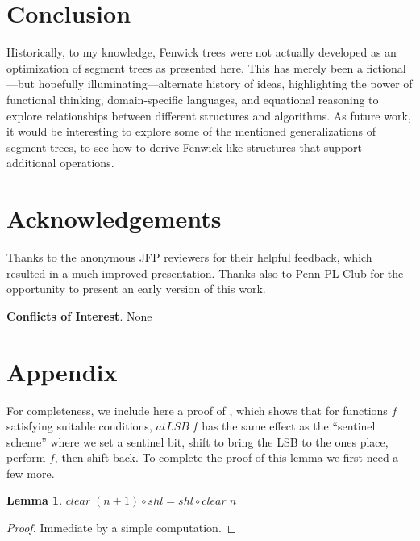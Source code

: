 \documentclass{jfp}
\newcommand{\Varid}[1]{\mathit{#1}}
\providecommand{\pref}{}
\renewcommand{\pref}[1]{\prettyref{#1}}
\newtheorem{lem}[thm]{Lemma}
\theoremstyle{definition}
\theoremstyle{remark}
\newif\ifJFP
\begin{document}
\section{Conclusion}

Historically, to my knowledge, Fenwick trees were not actually
developed as an optimization of segment trees as presented here.  This
has merely been a fictional---but hopefully illuminating---alternate
history of ideas, highlighting the power of functional thinking,
domain-specific languages, and equational reasoning to explore
relationships between different structures and algorithms.  As future
work, it would be interesting to explore some of the mentioned
generalizations of segment trees, to see how to derive Fenwick-like
structures that support additional operations.

\section*{Acknowledgements}

Thanks to the anonymous JFP reviewers for their helpful feedback,
which resulted in a much improved presentation.  Thanks also to Penn PL
Club for the opportunity to present an early version of this work.
\bigskip

\noindent \textbf{Conflicts of Interest}. None




\ifJFP
\else
\section*{Appendix}

For completeness, we include here a proof of
\pref{lem:sentinel-scheme}, which shows that for functions $f$
satisfying suitable conditions, \ensuremath{\Varid{atLSB}\;\Varid{f}} has the same effect as the
``sentinel scheme'' where we set a sentinel bit, shift to bring the
LSB to the ones place, perform $f$, then shift back.  To complete the
proof of this lemma we first need a few more.

\begin{lem} \label{lem:clearshl}
  \ensuremath{\Varid{clear}\;(\Varid{n}\mathbin{+}\mathrm{1})\mathbin{\circ}\Varid{shl}\mathrel{=}\Varid{shl}\mathbin{\circ}\Varid{clear}\;\Varid{n}}
\end{lem}
\begin{proof}
  Immediate by a simple computation.
\end{proof}
\end{document}
